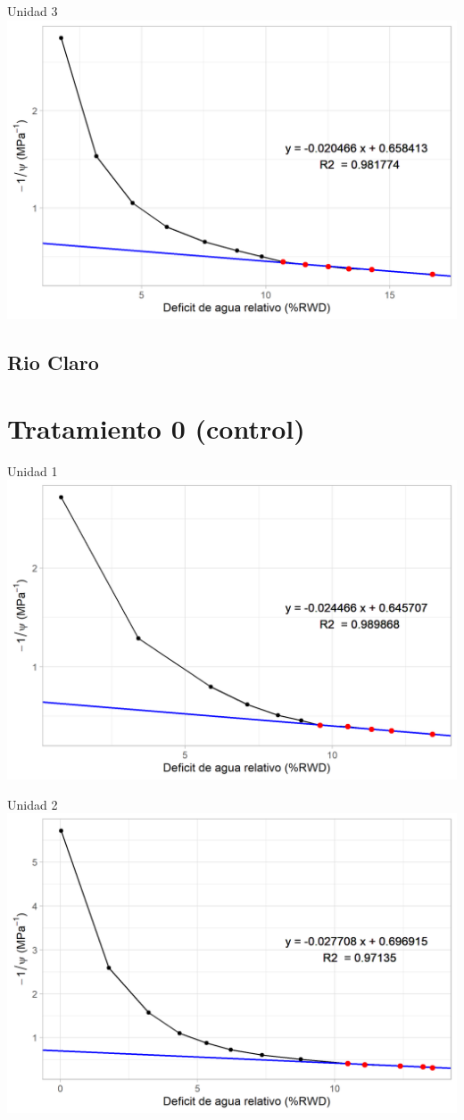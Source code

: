 \documentclass[
  letterpaper,
  DIV=11,
  numbers=noendperiod]{scrreprt}
\begin{document}
Unidad 3 \includegraphics{figuras/06_tlp/tlp_la_esperanza_T4_3.png}

\section{Rio Claro}\label{rio-claro}

\chapter{Tratamiento 0 (control)}

Unidad 1 \includegraphics{figuras/06_tlp/tlp_rio_claro_T0_1.png}

Unidad 2 \includegraphics{figuras/06_tlp/tlp_rio_claro_T0_2.png}
\end{document}
